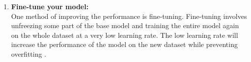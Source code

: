 \begin{enumerate}
    \item {\bf Fine-tune your model:} \\[3pt]
        One method of improving the performance is fine-tuning. Fine-tuning involves 
        unfreezing some part of the base model and training the entire model again on 
        the whole dataset at a very low learning rate. The low learning rate will 
        increase the performance of the model on the new dataset while preventing 
        overfitting \cite{v7lab}.
\end{enumerate}

